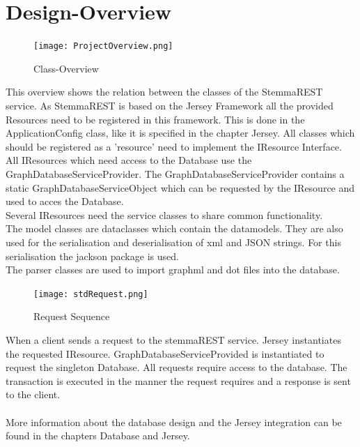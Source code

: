 \documentclass[11pt,fleqn,openany]{book} %
\begin{document}
\chapter{Design-Overview}
\begin{figure}[h!]
  \caption{Class-Overview}
  \centering
    \texttt{[image: ProjectOverview.png]}
\end{figure}
This overview shows the relation between the classes of the StemmaREST service. As StemmaREST is based on the Jersey Framework all the provided Resources need to be registered in this framework. This is done in the ApplicationConfig class, like it is specified in the chapter Jersey. All classes which should be registered as a 'resource' need to implement the IResource Interface. \\
All IResources which need access to the Database use the GraphDatabaseServiceProvider. The GraphDatabaseServiceProvider contains a static GraphDatabaseServiceObject which can be requested by the IResource and used to acces the Database.\\
Several IResources need the service classes to share common functionality.\\
The model classes are dataclasses which contain the datamodels. They are also used for the serialisation and deserialisation of xml and JSON strings. For this serialisation the jackson package is used.\\
The parser classes are used to import graphml and dot files into the database.

\begin{figure}[h!]
  \caption{Request Sequence}
  \centering
    \texttt{[image: stdRequest.png]}
\end{figure}
When a client sends a request to the stemmaREST service. Jersey instantiates the requested IResource. GraphDatabaseServiceProvided is instantiated to request the singleton Database. All requests require access to the database. The transaction is executed in the manner the request requires and a response is sent to the client. 
\\ \quad \\
More information about the database design and the Jersey integration can be found in the chapters Database and Jersey. 

\end{document}
